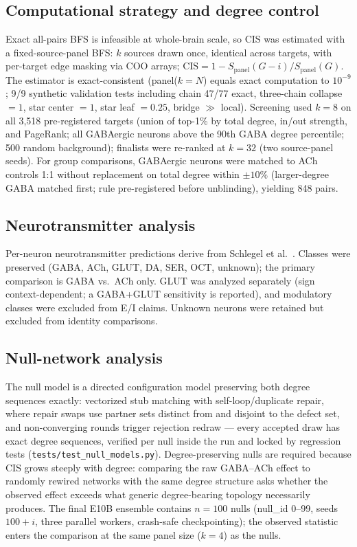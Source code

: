 \subsection{Computational strategy and degree control}
Exact all-pairs BFS is infeasible at whole-brain scale, so CIS was
estimated with a fixed-source-panel BFS: $k$ sources drawn once, identical
across targets, with per-target edge masking via COO arrays;
$\mathrm{CIS}=1-S_{\mathrm{panel}}(G-i)/S_{\mathrm{panel}}(G)$. The
estimator is exact-consistent (panel($k{=}N$) equals exact computation to
$10^{-9}$; 9/9 synthetic validation tests including chain 47/77 exact,
three-chain collapse $=1$, star center $=1$, star leaf $=0.25$, bridge
$\gg$ local). Screening used $k{=}8$ on all 3,518 pre-registered targets
(union of top-1\% by total degree, in/out strength, and PageRank; all
GABAergic neurons above the 90th GABA degree percentile; 500 random
background); finalists were re-ranked at $k{=}32$ (two source-panel
seeds). For group comparisons, GABAergic neurons were matched to ACh
controls 1:1 without replacement on total degree within $\pm10\%$
(larger-degree GABA matched first; rule pre-registered before
unblinding), yielding 848 pairs.

\subsection{Neurotransmitter analysis}
Per-neuron neurotransmitter predictions derive from Schlegel et al.\
\cite{schlegel2024}. Classes were preserved (GABA, ACh, GLUT, DA, SER,
OCT, unknown); the primary comparison is GABA vs.\ ACh only. GLUT was
analyzed separately (sign context-dependent; a GABA+GLUT sensitivity is
reported), and modulatory classes were excluded from E/I claims. Unknown
neurons were retained but excluded from identity comparisons.

\subsection{Null-network analysis}
The null model is a directed configuration model preserving both degree
sequences exactly: vectorized stub matching with self-loop/duplicate
repair, where repair swaps use partner sets distinct from and disjoint to
the defect set, and non-converging rounds trigger rejection redraw ---
every accepted draw has exact degree sequences, verified per null inside
the run and locked by regression tests (\texttt{tests/test\_null\_models.py}).
Degree-preserving nulls are required because CIS grows steeply with
degree: comparing the raw GABA--ACh effect to randomly rewired networks
with the same degree structure asks whether the observed effect exceeds
what generic degree-bearing topology necessarily produces. The final
E10B ensemble contains $n=100$ nulls (null\_id 0--99, seeds $100+i$,
three parallel workers, crash-safe checkpointing); the observed statistic
enters the comparison at the same panel size ($k{=}4$) as the nulls.

